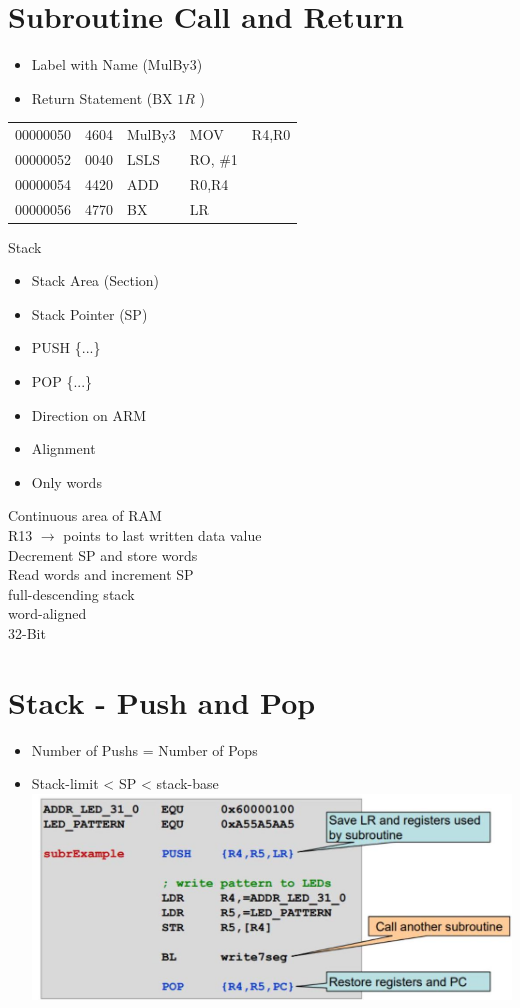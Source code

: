 \documentclass[10pt]{article}
\begin{document}
\section*{Subroutine Call and Return}
\begin{itemize}
  \item Label with Name (MulBy3)
  \item Return Statement (BX $1 R$ )
\end{itemize}

\begin{center}
\begin{tabular}{lllll}
00000050 & 4604 & MulBy3 & MOV & R4,R0 \\
00000052 & 0040 & LSLS & RO, \#1 &  \\
00000054 & 4420 & ADD & R0,R4 &  \\
00000056 & 4770 & BX & LR &  \\
\hline
\end{tabular}
\end{center}

Stack

\begin{itemize}
  \item Stack Area (Section)
  \item Stack Pointer (SP)
  \item PUSH \{...\}
  \item POP \{...\}
  \item Direction on ARM
  \item Alignment
  \item Only words
\end{itemize}

Continuous area of RAM\\
R13 $\rightarrow$ points to last written data value\\
Decrement SP and store words\\
Read words and increment SP\\
full-descending stack\\
word-aligned\\
32-Bit

\section*{Stack - Push and Pop}
\begin{itemize}
  \item Number of Pushs = Number of Pops
  \item Stack-limit < SP < stack-base\\
\includegraphics[width=\linewidth]{images/2024_12_29_79e6b22f503fb7b4f718g-08}
\end{itemize}
\end{document}
